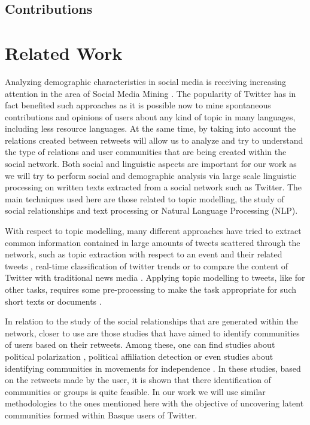 \documentclass[information,article,submit,moreauthors,pdftex,10pt,a4paper]{Definitions/mdpi}
\begin{document}
\subsection{Contributions}\label{sec:contributions}



\section{Related Work}\label{sec:background}

Analyzing demographic characteristics in social media is receiving increasing attention in the area of Social Media Mining \cite{morgan2017predicting}. The popularity of Twitter has in fact benefited such approaches as it is possible now to mine spontaneous contributions and opinions of users about any kind of topic in many languages, including less resource languages. At the same time, by taking into account the relations created between retweets will allow us to analyze and try to understand the type of relations and user communities that are being created within the social network. Both social and linguistic aspects are important for our work as we will try to perform social and demographic analysis via large scale linguistic processing on written texts extracted from a social network such as Twitter. The main techniques used here are those related to topic modelling, the study of social relationships and text processing or Natural Language Processing (NLP).

With respect to topic modelling, many different approaches have tried to extract common information contained in large amounts of tweets scattered through the network, such as topic extraction with respect to an event and their related tweets \cite{hu2012lda}, real-time classification of twitter trends \cite{zubiaga2015real} or to compare the content of Twitter with traditional news media \cite{zhao2011comparing}. Applying topic modelling to tweets, like for other tasks, requires some pre-processing to make the task appropriate for such short texts or documents \cite{hong2010empirical}.

In relation to the study of the social relationships that are generated within the network, closer to use are those studies that have aimed to identify communities of users based on their retweets. Among these, one can find studies about political polarization \cite{conover2011political}, political affiliation detection \cite{pennacchiotti2011democrats} or even studies about identifying communities in movements for independence \cite{zubiaga2017stance}. In these studies, based on the retweets made by the user, it is shown that there identification of communities or groups is quite feasible. In our work we will use similar methodologies to the ones mentioned here with the objective of uncovering latent communities formed within Basque users of Twitter.
\end{document}
